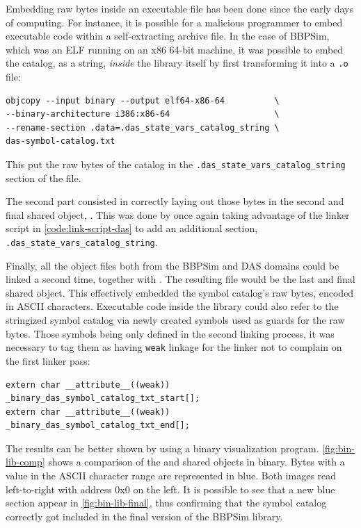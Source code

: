 {Embedding raw bytes inside an executable file has been done since the early days of computing. For instance, it is possible for a malicious programmer to embed executable code within a self-extracting archive file\cite{online:sfx}. In the case of BBPSim, which was an ELF running on an x86 64-bit machine, it was possible to embed the catalog, as a string, \textit{inside} the library itself by first transforming it into a \texttt{.o} file:
\begin{verbatim}
objcopy --input binary --output elf64-x86-64          \
--binary-architecture i386:x86-64                     \
--rename-section .data=.das_state_vars_catalog_string \
das-symbol-catalog.txt                                
\end{verbatim}

This put the raw bytes of the catalog in the \texttt{.das_state_vars_catalog_string} section of the  file.

The second part consisted in correctly laying out those bytes in the second and final shared object, . This was done by once again taking advantage of the linker script in \autoref{code:link-script-das} to add an additional section, \texttt{.das_state_vars_catalog_string}.

Finally, all the object files both from the BBPSim and DAS domains could be linked a second time, together with . The resulting  file would be the last and final shared object. This effectively embedded the symbol catalog's raw bytes, encoded in \gls{ASCII} characters. Executable code inside the library could also refer to the stringized symbol catalog via newly created symbols used as guards for the raw bytes. Those symbols being only defined in the second linking process, it was necessary to tag them as having \texttt{weak} linkage for the linker not to complain on the first linker pass:
\begin{verbatim}
extern char __attribute__((weak)) _binary_das_symbol_catalog_txt_start[];
extern char __attribute__((weak)) _binary_das_symbol_catalog_txt_end[];
\end{verbatim}

The results can be better shown by using a binary visualization program\cite{online:binvisio}. \autoref{fig:bin-lib-comp} shows a comparison of the  and  shared objects in binary. Bytes with a value in the \gls{ASCII} character range are represented in blue. Both images read left-to-right with address 0x0 on the left. It is possible to see that a new blue section appear in \autoref{fig:bin-lib-final}, thus confirming that the symbol catalog correctly got included in the final version of the BBPSim library.

}
